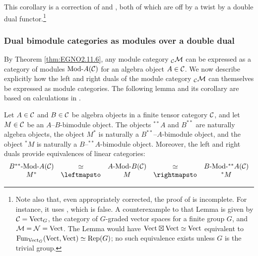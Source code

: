 \documentclass{amsart}
\begin{document}
\begin{remark} \label{rmk:Deligne_pdt_as_mod_functor}
This corollary is a correction of \cite[Remark 3.6]{0909.3140} and \cite[Thm. 3.20]{0911.4979}, both of which are off by a twist by a double dual functor.\footnote{Note also that, even appropriately corrected, the proof of \cite[Thm 3.20]{0911.4979} is incomplete.  For instance, it uses \cite[Lemma 3.21]{0911.4979}, which is false.  A counterexample to that Lemma is given by $\mathcal C = \mathrm{Vect}_G$, the category of $G$-graded vector spaces for a finite group $G$, and $\mathcal M = \mathcal N = \mathrm{Vect}$.  The Lemma would have $\mathrm{Vect} \boxtimes \mathrm{Vect} \simeq \mathrm{Vect}$ equivalent to $\operatorname{Fun}_{\mathrm{Vect}_G}(\mathrm{Vect},\mathrm{Vect}) \simeq \mathrm{Rep}(G)$; no such equivalence exists unless $G$ is the trivial group.} 
\end{remark} %


\subsubsection{Dual bimodule categories as modules over a double dual}

By Theorem \ref{thm:EGNO2.11.6}, any module category ${}_\mathcal C \mathcal M$ can be expressed as a category of modules $\Mod{}{A}(\cC)$ for an algebra object $A \in \mathcal C$.  We now describe explicitly how the left and right duals of the module category ${}_\mathcal C \mathcal M$ can themselves be expressed as module categories.  The following lemma and its corollary are based on calculations in \cite[\S 3]{MR2097289}.

\begin{lemma}\label{lem:dualing-amod}
Let $A \in \mathcal C$ and $B \in \mathcal C$ be algebra objects in a finite tensor category $\mathcal C$, and let $M \in \mathcal C$ be an $A$--$B$-bimodule object.  The objects ${}^{**} A$ and $B^{**}$ are naturally algebra objects, the object $M^*$ is naturally a $B^{**}$--$A$-bimodule object, and the object ${}^* M$ is naturally a $B$--${}^{**} A$-bimodule object.  Moreover, the left and right duals provide equivalences of linear categories:
\begin{equation*}
\begin{array}{ccccc}
	\Mod{B^{**}}{A}(\cC) &\simeq& \Mod{A}{B}(\cC) &\simeq& \Mod{B}{{}^{**}A}(\cC) \\
	M^* &\leftmapsto& M &\rightmapsto& {}^* M
\end{array}
\end{equation*}
\end{lemma}
\end{document}
